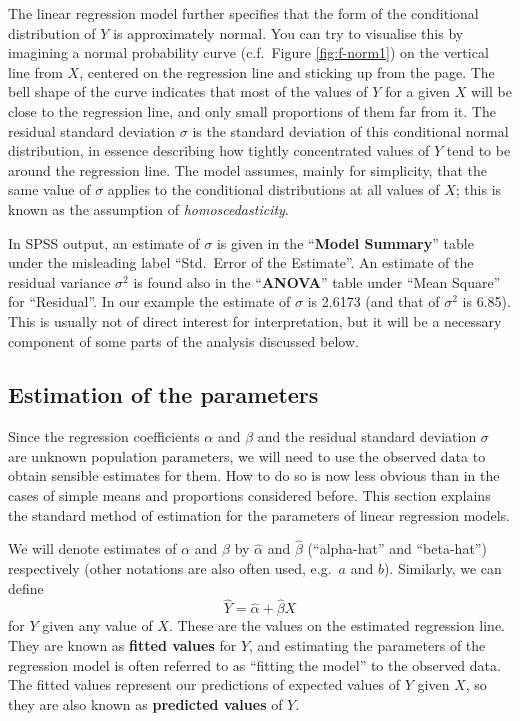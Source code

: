 \documentclass[11pt,a4paper,openany]{book}
\begin{document}
The linear regression model further specifies that the form of the
conditional distribution of \(Y\) is approximately normal. You can try
to visualise this by imagining a normal probability curve (c.f.~Figure
\ref{fig:f-norm1}) on the vertical line from \(X\), centered on the
regression line and sticking up from the page. The bell shape of the
curve indicates that most of the values of \(Y\) for a given \(X\) will
be close to the regression line, and only small proportions of them far
from it. The residual standard deviation \(\sigma\) is the standard
deviation of this conditional normal distribution, in essence describing
how tightly concentrated values of \(Y\) tend to be around the
regression line. The model assumes, mainly for simplicity, that the same
value of \(\sigma\) applies to the conditional distributions at all
values of \(X\); this is known as the assumption of
\emph{homoscedasticity}.

In SPSS output, an estimate of \(\sigma\) is given in the
``\textbf{Model Summary}'' table under the misleading label ``Std.~Error
of the Estimate''. An estimate of the residual variance \(\sigma^{2}\)
is found also in the ``\textbf{ANOVA}'' table under ``Mean Square'' for
``Residual''. In our example the estimate of \(\sigma\) is 2.6173 (and
that of \(\sigma^{2}\) is 6.85). This is usually not of direct interest
for interpretation, but it will be a necessary component of some parts
of the analysis discussed below.

\subsection{Estimation of the
parameters}\label{ss-regression-simple-est}

Since the regression coefficients \(\alpha\) and \(\beta\) and the
residual standard deviation \(\sigma\) are unknown population
parameters, we will need to use the observed data to obtain sensible
estimates for them. How to do so is now less obvious than in the cases
of simple means and proportions considered before. This section explains
the standard method of estimation for the parameters of linear
regression models.

We will denote estimates of \(\alpha\) and \(\beta\) by \(\hat{\alpha}\)
and \(\hat{\beta}\) (``alpha-hat'' and ``beta-hat'') respectively (other
notations are also often used, e.g.~\(a\) and \(b\)). Similarly, we can
define \[\hat{Y}=\hat{\alpha}+\hat{\beta} X\] for \(Y\) given any value
of \(X\). These are the values on the estimated regression line. They
are known as \textbf{fitted values} for \(Y\), and estimating the
parameters of the regression model is often referred to as ``fitting the
model'' to the observed data. The fitted values represent our
predictions of expected values of \(Y\) given \(X\), so they are also
known as \textbf{predicted values} of \(Y\).
\end{document}
